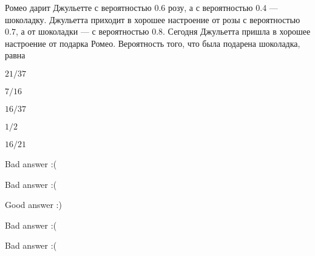 
\begin{question}
Ромео дарит Джульетте с вероятностью \(0.6\) розу, а с вероятностью
\(0.4\) --- шоколадку. Джульетта приходит в хорошее настроение от розы с
вероятностью \(0.7\), а от шоколадки --- с вероятностью \(0.8\). Сегодня
Джульетта пришла в хорошее настроение от подарка Ромео. Вероятность
того, что была подарена шоколадка, равна
\begin{answerlist}
  \item \(21/37\)
  \item \(7/16\)
  \item \(16/37\)
  \item \(1/2\)
  \item \(16/21\)
\end{answerlist}
\end{question}

\begin{solution}
\begin{answerlist}
  \item Bad answer :(
  \item Bad answer :(
  \item Good answer :)
  \item Bad answer :(
  \item Bad answer :(
\end{answerlist}
\end{solution}

